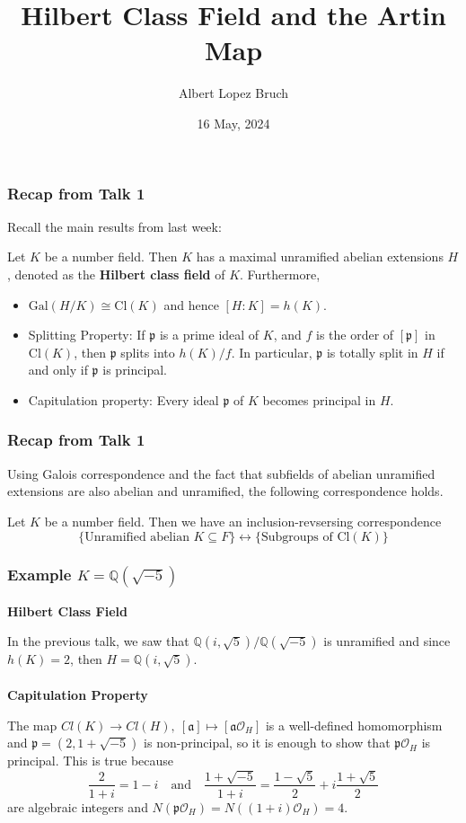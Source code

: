 \documentclass{beamer}
\title{Hilbert Class Field and the Artin Map}
\author{Albert Lopez Bruch}
\date{16 May, 2024}
\newcommand{\Gal}{\mathrm{Gal}}
\newcommand{\Cl}{\mathrm{Cl}}
\newcommand{\QQ}{\mathbb{Q}}
\newcommand{\pp}{\mathfrak{p}}
\newcommand{\af}{\mathfrak{a}}
\theoremstyle{plain}
\begin{document}
\frame{\titlepage}


\begin{frame}
    \frametitle{Recap from Talk 1}
    Recall the main results from last week:
    \begin{theorem}
        Let $K$ be a number field. Then $K$ has a maximal unramified abelian extensions $H$, denoted as the \textbf{Hilbert class field} of $K$. Furthermore, 
        \begin{itemize}
            \item $\Gal(H/K)\cong\Cl(K)$ and hence $[H:K]=h(K)$.
            \item Splitting Property: If $\pp$ is a prime ideal of $K$, and $f$ is the order of $[\pp]$ in $\Cl(K)$, then $\pp$ splits into $h(K)/f$. In particular, $\pp$ is totally split in $H$ if and only if $\pp$ is principal.
            \item Capitulation property: Every ideal $\pp$ of $K$ becomes principal in $H$. 
        \end{itemize}
    \end{theorem}
\end{frame}

\begin{frame}
    \frametitle{Recap from Talk 1}
    Using Galois correspondence and the fact that subfields of abelian unramified extensions are also abelian and unramified, the following correspondence holds.

    \begin{corollary}
        Let $K$ be a number field. Then we have an inclusion-revsersing correspondence
        \[
            \{\textrm{Unramified abelian }K\subseteq F\}\longleftrightarrow \{\textrm{Subgroups of }\Cl(K)\}    
        \]
    \end{corollary}
\end{frame}



\begin{frame}
    \frametitle{Example $K=\QQ(\sqrt{-5})$}
    \textbf{Hilbert Class Field} 

    In the previous talk, we saw that $\QQ(i,\sqrt{5})/\QQ(\sqrt{-5})$ is unramified and since $h(K)=2$, then $H=\QQ(i,\sqrt{5})$. 
    \pause
    \\~\\
    \textbf{Capitulation Property} 

    The map $Cl(K)\rightarrow Cl(H),\ [\af]\mapsto[\af\mathcal{O}_H]$ is a well-defined homomorphism and $\pp=(2,1+\sqrt{-5})$ is non-principal, so it is enough to show that $\pp\mathcal{O}_H$ is principal. This is true because 
    $$\frac{2}{1+i}=1-i\quad\text{and}\quad\frac{1+\sqrt{-5}}{1+i}=\frac{1-\sqrt{5}}{2}+i\frac{1+\sqrt{5}}{2}$$
    are algebraic integers and $N(\pp\mathcal{O}_H)=N((1+i)\mathcal{O}_H)=4$.
\end{frame}
\end{document}
